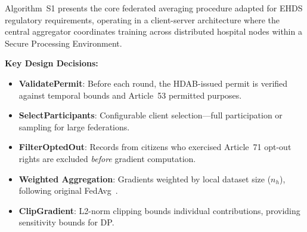 \documentclass[conference]{IEEEtran}
\begin{document}
Algorithm~S1 presents the core federated averaging procedure adapted for EHDS regulatory requirements, operating in a client-server architecture where the central aggregator coordinates training across distributed hospital nodes within a Secure Processing Environment.

\textbf{Key Design Decisions:}
\begin{itemize}
    \item \textbf{ValidatePermit}: Before each round, the HDAB-issued permit is verified against temporal bounds and Article~53 permitted purposes.
    \item \textbf{SelectParticipants}: Configurable client selection---full participation or sampling for large federations.
    \item \textbf{FilterOptedOut}: Records from citizens who exercised Article~71 opt-out rights are excluded \textit{before} gradient computation.
    \item \textbf{Weighted Aggregation}: Gradients weighted by local dataset size ($n_h$), following original FedAvg~\cite{mcmahan2017communication}.
    \item \textbf{ClipGradient}: L2-norm clipping bounds individual contributions, providing sensitivity bounds for DP.
\end{itemize}
\end{document}
